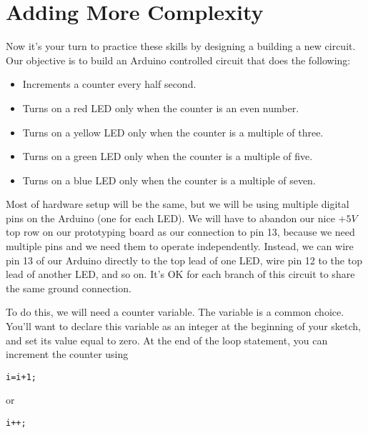 
\section{Adding More Complexity}

Now it's your turn to practice these skills by designing a building a new
circuit. Our objective is to build an Arduino
controlled circuit that does the following:
\begin{itemize}
\item Increments a counter every half second.
\item Turns on a red LED only when the counter is an even number.
\item Turns on a yellow LED only when the counter is a multiple of three.
\item Turns on a green LED only when the counter is a multiple of five.
\item Turns on a blue LED only when the counter is a multiple of seven.
\end{itemize}
Most of hardware setup will be the same, but we will be using multiple
digital pins on the Arduino (one for each LED). We will have to abandon our 
nice $+5\unit{V}$ top row on our prototyping board as our connection to
pin 13, because we need multiple pins and we need them to operate independently.
Instead, we can wire pin 13 of our Arduino directly to the top lead of one LED, 
wire pin 12 to the top lead of another LED, and so on. It's OK for each branch
of this circuit to share the same ground connection.

To do this, we will need a counter variable. The variable  is a common
choice. You'll want to declare this variable as an integer at the beginning of
your sketch, and set its value equal to zero. At the end of the loop statement,
you can increment the counter using 
\begin{lstlisting}[language=Arduino]
    i=i+1;
\end{lstlisting}
or
\begin{lstlisting}[language=Arduino]
    i++;
\end{lstlisting}

